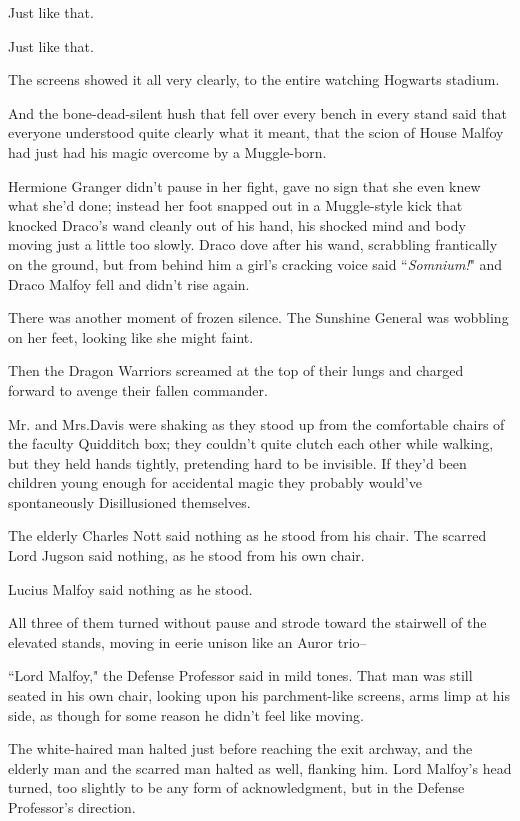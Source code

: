Just like that.

Just like that.

The screens showed it all very clearly, to the entire watching Hogwarts stadium.

And the bone-dead-silent hush that fell over every bench in every stand said that everyone understood quite clearly what it meant, that the scion of House Malfoy had just had his magic overcome by a Muggle-born.

Hermione Granger didn't pause in her fight, gave no sign that she even knew what she'd done; instead her foot snapped out in a Muggle-style kick that knocked Draco's wand cleanly out of his hand, his shocked mind and body moving just a little too slowly. Draco dove after his wand, scrabbling frantically on the ground, but from behind him a girl's cracking voice said ``\emph{Somnium!}" and Draco Malfoy fell and didn't rise again.

There was another moment of frozen silence. The Sunshine General was wobbling on her feet, looking like she might faint.

Then the Dragon Warriors screamed at the top of their lungs and charged forward to avenge their fallen commander.

\later

Mr. and Mrs.\?Davis were shaking as they stood up from the comfortable chairs of the faculty Quidditch box; they couldn't quite clutch each other while walking, but they held hands tightly, pretending hard to be invisible. If they'd been children young enough for accidental magic they probably would've spontaneously Disillusioned themselves.

The elderly Charles Nott said nothing as he stood from his chair. The scarred Lord Jugson said nothing, as he stood from his own chair.

Lucius Malfoy said nothing as he stood.

All three of them turned without pause and strode toward the stairwell of the elevated stands, moving in eerie unison like an Auror trio\---

``Lord Malfoy," the Defense Professor said in mild tones. That man was still seated in his own chair, looking upon his parchment-like screens, arms limp at his side, as though for some reason he didn't feel like moving.

The white-haired man halted just before reaching the exit archway, and the elderly man and the scarred man halted as well, flanking him. Lord Malfoy's head turned, too slightly to be any form of acknowledgment, but in the Defense Professor's direction.

